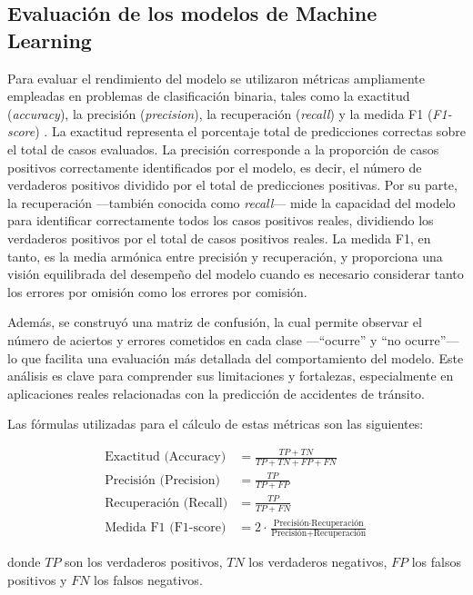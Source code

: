 \documentclass[12pt]{article}
\begin{document}
\subsection{Evaluación de los modelos de Machine Learning}

Para evaluar el rendimiento del modelo se utilizaron métricas ampliamente empleadas en problemas de clasificación binaria, tales como la exactitud (\textit{accuracy}), la precisión (\textit{precision}), la recuperación (\textit{recall}) y la medida F1 (\textit{F1-score}) \parencite{manning2008}. La exactitud representa el porcentaje total de predicciones correctas sobre el total de casos evaluados. La precisión corresponde a la proporción de casos positivos correctamente identificados por el modelo, es decir, el número de verdaderos positivos dividido por el total de predicciones positivas. Por su parte, la recuperación —también conocida como \textit{recall}— mide la capacidad del modelo para identificar correctamente todos los casos positivos reales, dividiendo los verdaderos positivos por el total de casos positivos reales. La medida F1, en tanto, es la media armónica entre precisión y recuperación, y proporciona una visión equilibrada del desempeño del modelo cuando es necesario considerar tanto los errores por omisión como los errores por comisión.

Además, se construyó una matriz de confusión, la cual permite observar el número de aciertos y errores cometidos en cada clase —“ocurre” y “no ocurre”— lo que facilita una evaluación más detallada del comportamiento del modelo. Este análisis es clave para comprender sus limitaciones y fortalezas, especialmente en aplicaciones reales relacionadas con la predicción de accidentes de tránsito.

Las fórmulas utilizadas para el cálculo de estas métricas son las siguientes:

\[
\begin{aligned}
\text{Exactitud (Accuracy)} &= \frac{TP + TN}{TP + TN + FP + FN} \\
\text{Precisión (Precision)} &= \frac{TP}{TP + FP} \\
\text{Recuperación (Recall)} &= \frac{TP}{TP + FN} \\
\text{Medida F1 (F1-score)} &= 2 \cdot \frac{\text{Precisión} \cdot \text{Recuperación}}{\text{Precisión} + \text{Recuperación}}
\end{aligned}
\]

donde \( TP \) son los verdaderos positivos, \( TN \) los verdaderos negativos, \( FP \) los falsos positivos y \( FN \) los falsos negativos.
\end{document}
